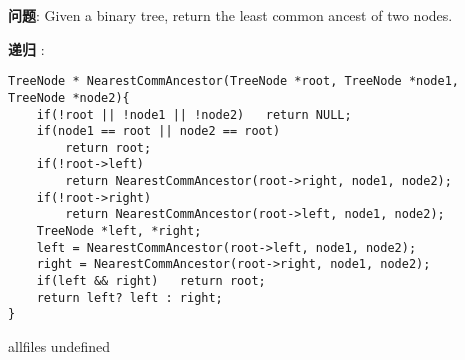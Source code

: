 \documentclass{article}
\begin{document}
\begin{CJK}{UTF8}{gbsn}     %

\else
    
\begin{description}
    \item{\textbf{问题}}: Given a binary tree,  return the least common ancest of two nodes.
    \item{\textbf{递归}} : 
    \\
    \begin{lstlisting}
TreeNode * NearestCommAncestor(TreeNode *root, TreeNode *node1, TreeNode *node2){
    if(!root || !node1 || !node2)   return NULL;
    if(node1 == root || node2 == root)
        return root;
    if(!root->left)
        return NearestCommAncestor(root->right, node1, node2);
    if(!root->right)
        return NearestCommAncestor(root->left, node1, node2);
    TreeNode *left, *right;
    left = NearestCommAncestor(root->left, node1, node2);
    right = NearestCommAncestor(root->right, node1, node2);
    if(left && right)   return root;
    return left? left : right;
}
    \end{lstlisting}
\end{description}

\fi

\ifx allfiles undefined
\end{CJK}
\end{document}
